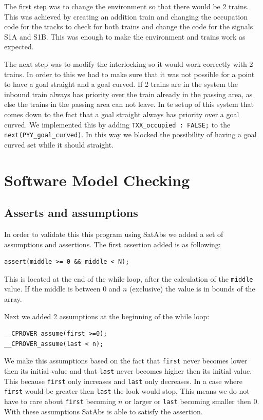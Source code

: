 \documentclass[a4paper]{article}
\begin{document}
	The first step was to change the environment so that there would be 2 trains. This was achieved by creating an addition train and changing the occupation code for the tracks to check for both trains and change the code for the signals S1A and S1B. This was enough to make the environment and trains work as expected.
	
	The next step was to modify the interlocking so it would work correctly with 2 trains.
	In  order to this we had to make sure that it was not possible for a point to have a goal straight and a goal curved. If 2 trains are in the system the inbound train always has priority over the train already in the passing area, as else the trains in the passing area can not leave. In te setup of this system that comes down to the fact that a goal straight always has priority over a goal curved. We implemented this by adding \texttt{TXX\_occupied : FALSE;} to the \texttt{next(PYY\_goal\_curved)}. In this way we blocked the possibility of having a goal curved set while it should straight.
	
	\section{Software Model Checking}
	
	
	\subsection{Asserts and assumptions}
	In order to validate this this program using SatAbs we added a set of assumptions and assertions.
	The first assertion added is as following:
	\begin{lstlisting}	
assert(middle >= 0 && middle < N);
	\end{lstlisting}
	This is located at the end of the while loop, after the calculation of the \texttt{middle} value. If the middle is between $0$ and $n$ (exclusive) the value is in bounds of the array.
	
	Next we added 2 assumptions at the beginning of the while loop:
	\begin{lstlisting}
__CPROVER_assume(first >=0);
__CPROVER_assume(last < n);
	\end{lstlisting}
	We make this assumptions based on the fact that \texttt{first} never becomes lower then its initial value and that \texttt{last} never becomes higher then its initial value. This because \texttt{first} only increases and \texttt{last} only decreases. In a case where \texttt{first} would be greater then \texttt{last} the look would stop, This means we do not have to care about \texttt{first} becoming $n$ or larger or \texttt{last} becoming smaller then $0$.	
	With these assumptions SatAbs is able to satisfy the assertion.
	
\end{document}
